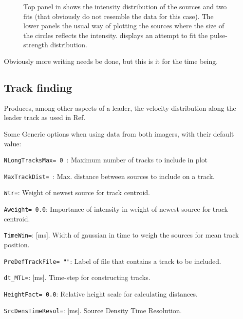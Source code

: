 \begin{figure}[h]
	\caption{Top panel in  shows the intensity distribution of the sources and two fits (that obviously do not resemble the data for this case). The lower panels the usual way of plotting the sources where the size of the circles reflects the intensity.
 displays an attempt to fit the pulse-strength distribution.}	 
\end{figure}

Obviously more writing needs be done, but this is it for the time being.

\subsection{Track finding}

Produces, among other aspects of a leader, the velocity distribution along the leader track as used in Ref.~\cite{Scholten:2021-RNL}

Some Generic options when using data from both imagers, with their default value:
\begin{enumerate*}
\item \verb!NLongTracksMax= 0 !: Maximum number of tracks to include in plot
\item \verb!MaxTrackDist= !: Max. distance between sources to include on a track.
\item \verb!Wtr=!: Weight of newest source for track centroid.
\item \verb!Aweight= 0.0!: Importance of intensity in weight of newest source for track centroid.
\item \verb!TimeWin=!: [ms]. Width of gaussian in time to weigh the sources for mean track position.
\item \verb!PreDefTrackFile= ""!: Label of file that contains a track to be included.
\item \verb!dt_MTL=!: [ms]. Time-step for constructing tracks.
\item \verb!HeightFact= 0.0!: Relative height scale for calculating distances.
\item \verb!SrcDensTimeResol=!: [ms]. Source Density Time Resolution.
\end{enumerate*}

